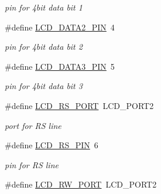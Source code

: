 \begin{DoxyCompactItemize}
\begin{DoxyCompactList}\small\item\em pin for 4bit data bit 1 \end{DoxyCompactList}\item 
\#define \hyperlink{group__pfleury__lcd_ga7f3d53627337f6535cc8daa35876510a}{L\+C\+D\+\_\+\+D\+A\+T\+A2\+\_\+\+P\+IN}~4\hypertarget{group__pfleury__lcd_ga7f3d53627337f6535cc8daa35876510a}{}\label{group__pfleury__lcd_ga7f3d53627337f6535cc8daa35876510a}

\begin{DoxyCompactList}\small\item\em pin for 4bit data bit 2 \end{DoxyCompactList}\item 
\#define \hyperlink{group__pfleury__lcd_ga54032ce0050853e181f879b69fec4370}{L\+C\+D\+\_\+\+D\+A\+T\+A3\+\_\+\+P\+IN}~5\hypertarget{group__pfleury__lcd_ga54032ce0050853e181f879b69fec4370}{}\label{group__pfleury__lcd_ga54032ce0050853e181f879b69fec4370}

\begin{DoxyCompactList}\small\item\em pin for 4bit data bit 3 \end{DoxyCompactList}\item 
\#define \hyperlink{group__pfleury__lcd_gac5be2a22727fd9ca349e1c9bcbfbcd47}{L\+C\+D\+\_\+\+R\+S\+\_\+\+P\+O\+RT}~L\+C\+D\+\_\+\+P\+O\+R\+T2\hypertarget{group__pfleury__lcd_gac5be2a22727fd9ca349e1c9bcbfbcd47}{}\label{group__pfleury__lcd_gac5be2a22727fd9ca349e1c9bcbfbcd47}

\begin{DoxyCompactList}\small\item\em port for RS line \end{DoxyCompactList}\item 
\#define \hyperlink{group__pfleury__lcd_gae5c0a0a5750f3aaea06083e3a4a31f5d}{L\+C\+D\+\_\+\+R\+S\+\_\+\+P\+IN}~6\hypertarget{group__pfleury__lcd_gae5c0a0a5750f3aaea06083e3a4a31f5d}{}\label{group__pfleury__lcd_gae5c0a0a5750f3aaea06083e3a4a31f5d}

\begin{DoxyCompactList}\small\item\em pin for RS line \end{DoxyCompactList}\item 
\#define \hyperlink{group__pfleury__lcd_gae8772bdf31db863b81805c837bdc2da2}{L\+C\+D\+\_\+\+R\+W\+\_\+\+P\+O\+RT}~L\+C\+D\+\_\+\+P\+O\+R\+T2\hypertarget{group__pfleury__lcd_gae8772bdf31db863b81805c837bdc2da2}{}\label{group__pfleury__lcd_gae8772bdf31db863b81805c837bdc2da2}


\end{DoxyCompactItemize}
